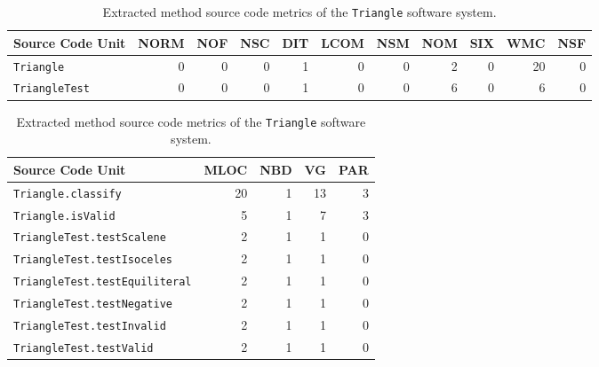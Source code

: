 \begin{table}
  \centering
  \caption{Extracted class source code metrics of the \texttt{Triangle} software system.}
  \label{tab:triangle_class_extracted_metrics}
  \begin{tabular}{|l|r|r|r|r|r|r|r|r|r|r|}
    \hline
    \rowcolor[RGB]{169,196,223}
    \textbf{Source Code Unit} & \textbf{NORM} & \textbf{NOF} & \textbf{NSC} & \textbf{DIT} & \textbf{LCOM} & \textbf{NSM} & \textbf{NOM} & \textbf{SIX} & \textbf{WMC} & \textbf{NSF} \\
    \hline \texttt{Triangle} & 0 & 0 & 0 & 1 & 0 & 0 & 2 & 0 & 20 & 0 \\
    \hline \texttt{TriangleTest} & 0 & 0 & 0 & 1 & 0 & 0 & 6 & 0 & 6 & 0 \\
    \hline
  \end{tabular}
  
  \vspace{3em}

  \centering
  \caption{Extracted method source code metrics of the \texttt{Triangle} software system.}
  \label{tab:triangle_method_extracted_metrics}
  \begin{tabular}{|l|r|r|r|r|}
    \hline
    \rowcolor[RGB]{169,196,223}
    \textbf{Source Code Unit} & \textbf{MLOC} & \textbf{NBD} & \textbf{VG} & \textbf{PAR} \\
    \hline \texttt{Triangle.classify} & 20 & 1 & 13 & 3 \\
    \hline \texttt{Triangle.isValid} & 5 & 1 & 7 & 3 \\
    \hline \texttt{TriangleTest.testScalene} & 2 & 1 & 1 & 0 \\
    \hline \texttt{TriangleTest.testIsoceles} & 2 & 1 & 1 & 0 \\
    \hline \texttt{TriangleTest.testEquiliteral} & 2 & 1 & 1 & 0 \\
    \hline \texttt{TriangleTest.testNegative} & 2 & 1 & 1 & 0 \\
    \hline \texttt{TriangleTest.testInvalid} & 2 & 1 & 1 & 0 \\
    \hline \texttt{TriangleTest.testValid} & 2 & 1 & 1 & 0 \\
    \hline
  \end{tabular}
\end{table}
\afterpage\clearpage


